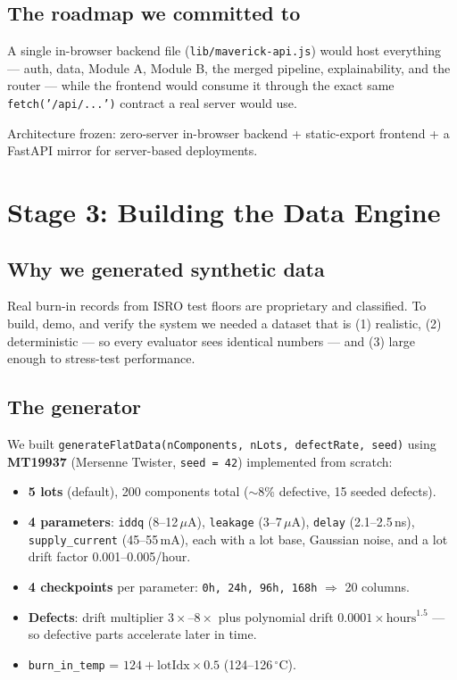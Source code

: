 \documentclass[11pt,a4paper]{article}
\newcommand{\code}[1]{\texttt{\small #1}}
\newcommand{\milestone}[1]{\par\vspace{0.6em}\noindent
  \begin{tcolorbox}[colback=solgreen!8,colframe=solgreen,
    title={\sffamily\bfseries\color{white}Milestone},arc=2pt,boxrule=1pt]
    #1
  \end{tcolorbox}\par\vspace{0.4em}}
\begin{document}
\subsection*{The roadmap we committed to}
A single in-browser backend file (\code{lib/maverick-api.js}) would host everything --- auth, data,
Module A, Module B, the merged pipeline, explainability, and the router --- while the frontend would
consume it through the exact same \code{fetch('/api/...')} contract a real server would use.

\milestone{Architecture frozen: zero-server in-browser backend + static-export frontend + a
  FastAPI mirror for server-based deployments.}

\section{Stage 3: Building the Data Engine}

\subsection*{Why we generated synthetic data}
Real burn-in records from ISRO test floors are proprietary and classified. To build, demo, and
verify the system we needed a dataset that is (1) realistic, (2) deterministic --- so every
evaluator sees identical numbers --- and (3) large enough to stress-test performance.

\subsection*{The generator}
We built \code{generateFlatData(nComponents, nLots, defectRate, seed)} using \textbf{MT19937}
(Mersenne Twister, \code{seed = 42}) implemented from scratch:

\begin{itemize}[leftmargin=1.5em]
  \item \textbf{5 lots} (default), 200 components total ($\sim$8\% defective, 15 seeded defects).
  \item \textbf{4 parameters}: \code{iddq} (8--12\,$\mu$A), \code{leakage} (3--7\,$\mu$A),
        \code{delay} (2.1--2.5\,ns), \code{supply\_current} (45--55\,mA), each with a lot base,
        Gaussian noise, and a lot drift factor 0.001--0.005/hour.
  \item \textbf{4 checkpoints} per parameter: \code{0h, 24h, 96h, 168h} $\Rightarrow$ 20 columns.
  \item \textbf{Defects}: drift multiplier $3\times$--$8\times$ plus polynomial drift
        $0.0001 \times \text{hours}^{1.5}$ --- so defective parts accelerate later in time.
  \item \code{burn\_in\_temp} = $124 + \text{lotIdx}\times 0.5$ (124--126\,$^{\circ}$C).
\end{itemize}
\end{document}
